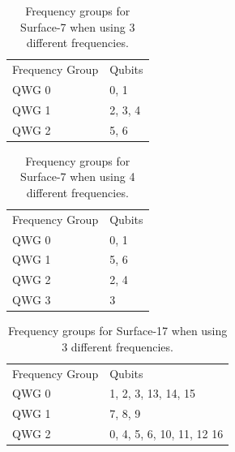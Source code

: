 \documentclass[11pt]{article}
\begin{document}
\begin{table}[h!]


\caption{\label{T1}
Frequency groups for Surface-7 when using 3 different frequencies. }
\centering

\begin{tabular}{ll}
 & \\
\hline
Frequency Group & Qubits\\
\hline
\cellcolor{red!25} QWG 0 & \cellcolor{red!25} 0, 1\\
\cellcolor{Aquamarine!25} QWG 1 & \cellcolor{Aquamarine!25} 2, 3, 4\\
\cellcolor{pink!25} QWG 2 & \cellcolor{pink!25} 5, 6\\

\hline
\end{tabular}
\end{table}

 
 \begin{table}[h!]


\caption{\label{T2}
Frequency groups for Surface-7 when using 4 different frequencies.}
\centering
\begin{tabular}{ll}
 & \\
\hline
Frequency Group & Qubits\\
\hline
\cellcolor{red!25} QWG 0 & \cellcolor{red!25} 0, 1\\
\cellcolor{pink!25} QWG 1 & \cellcolor{pink!25} 5, 6\\
\cellcolor{green!25} QWG 2 & \cellcolor{green!25} 2, 4\\
\cellcolor{cyan!25} QWG 3 & \cellcolor{cyan!25} 3\\
\hline
\end{tabular}
\end{table}
 
 
 





\begin{table}[h!]

\caption{\label{T4}
Frequency groups for Surface-17 when using 3 different frequencies.}
\centering
\begin{tabular}{ll}
 & \\
\hline
Frequency Group & Qubits\\
\hline
\cellcolor{red!25} QWG 0 & \cellcolor{red!25} 1, 2, 3, 13, 14, 15\\
\cellcolor{pink!25} QWG 1 & \cellcolor{pink!25} 7, 8, 9\\
\cellcolor{Aquamarine!25} QWG 2 & \cellcolor{Aquamarine!25} 0, 4, 5, 6, 10, 11, 12 16\\
\hline
\end{tabular}
\end{table}
\end{document}

